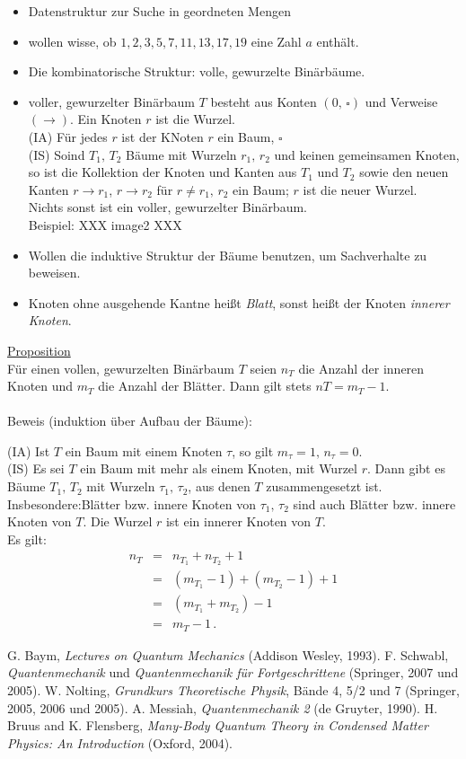 \documentclass[12pt]{book}													%
\newcommand{\nn}{\nonumber\\}
\newcommand{\bma}{\begin{eqnarray}}
\newcommand{\ema}{\end{eqnarray}\hspace{-0.015cm}}
\begin{document}
\begin{itemize}
\item Datenstruktur zur Suche in geordneten Mengen
\item wollen wisse, ob $1, 2, 3, 5, 7, 11, 13, 17, 19$ eine Zahl $a$ enthält.
\item Die kombinatorische Struktur: volle, gewurzelte Binärbäume.
\item voller, gewurzelter Binärbaum $T$ besteht aus Konten $(0,\,\square)$ und Verweise $(\rightarrow)$. Ein Knoten $r$ ist die Wurzel.\\
(IA) Für jedes $r$ ist der KNoten $r$ ein Baum, $\square$\\
(IS) Soind $T_1,\,T_2$ Bäume mit Wurzeln $r_1,\,r_2$ und keinen gemeinsamen Knoten, so ist die Kollektion der Knoten und Kanten aus $T_1$ und $T_2$ sowie den neuen Kanten $r\rightarrow r_1$, $r\rightarrow r_2$ für $r\neq r_1,\,r_2$ ein Baum; $r$ ist die neuer Wurzel.\\
Nichts sonst ist ein voller, gewurzelter Binärbaum.\\
Beispiel:
XXX image2 XXX
\item Wollen die induktive Struktur der Bäume benutzen, um Sachverhalte zu beweisen.
\item Knoten ohne ausgehende Kantne heißt \emph{Blatt}, sonst heißt der Knoten \emph{innerer Knoten}.
\end{itemize}
\underline{Proposition}\\
Für einen vollen, gewurzelten Binärbaum $T$ seien $n_T$ die Anzahl der inneren Knoten und $m_T$ die Anzahl der Blätter. Dann gilt stets $nT=m_T-1$.\\\\
Beweis (induktion über Aufbau der Bäume):

(IA) Ist $T$ ein Baum mit einem Knoten $\tau$, so gilt $m_{\tau}=1,\,n_{\tau}=0$.\\
(IS) Es sei $T$ ein Baum mit mehr als einem Knoten, mit Wurzel $r$. Dann gibt es Bäume $T_1,\,T_2$ mit Wurzeln $\tau_1,\,\tau_2$, aus denen $T$ zusammengesetzt ist.\\
Insbesondere:Blätter bzw. innere Knoten von $\tau_1,\,\tau_2$ sind auch Blätter bzw. innere Knoten von $T$. Die Wurzel $r$ ist ein innerer Knoten von $T$.\\
Es gilt:
\bma
n_T&=&n_{T_1}+n_{T_2}+1\nn
&=&(m_{T_1}-1)+(m_{T_2}-1)+1\nn
&=&(m_{T_1}+m_{T_2})-1\nn
&=&m_T-1\,.
\ema


\newpage
\begin{thebibliography}{}
G. Baym, \emph{Lectures on Quantum Mechanics} (Addison Wesley, 1993).
F. Schwabl, \emph{Quantenmechanik} und \emph{Quantenmechanik f\"ur Fortgeschrittene} (Springer, 2007 und 2005).
W. Nolting, \emph{Grundkurs Theoretische Physik}, B\"ande 4, 5/2 und 7 (Springer, 2005, 2006 und 2005).
A. Messiah, \emph{Quantenmechanik 2} (de Gruyter, 1990).
H. Bruus and K. Flensberg, \emph{Many-Body Quantum Theory in Condensed Matter Physics: An Introduction} (Oxford, 2004).
\end{thebibliography}
\end{document}
